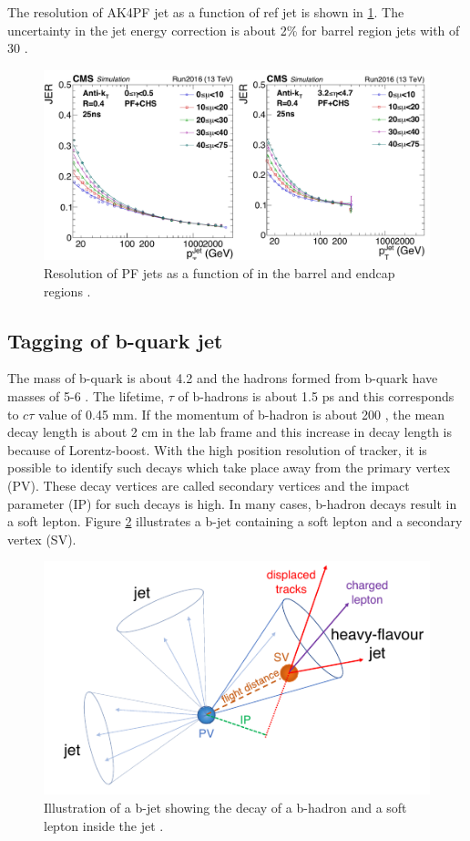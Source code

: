 The resolution of AK4PF jet as a function of ref jet is shown in \ref{fig:JER_2016}. The uncertainty in the jet energy correction is about 2\% for barrel region jets with \pt of 30 \gev \cite{CMS-DP-2018-028}.
\begin{figure}[h!]
\centering
\includegraphics[width=0.8\linewidth]{../Figures/Chap2/JER_2016}
\captionsetup{width=.9\linewidth}
\caption[AK4PF jet energy resolution]{Resolution of PF jets as a function of \pt in the barrel and endcap regions \cite{CMS-DP-2016-020}.}
\label{fig:JER_2016}
\end{figure}
\subsection{Tagging of b-quark jet}
The mass of b-quark is about 4.2 \gev and the hadrons formed from b-quark have masses of 5-6 \gev. The lifetime, $\tau$ of b-hadrons is about 1.5 ps and this corresponds to $c\tau$ value of 0.45 mm. If the momentum of b-hadron is about 200 \gev, the mean decay length is about 2 cm in the lab frame and this increase in decay length is because of Lorentz-boost. With the high position resolution of tracker, it is possible to identify such decays which take place away from the primary vertex (PV). These decay vertices are called secondary vertices and the impact parameter (IP) for such decays is high. In many cases, b-hadron decays result in a soft lepton. Figure \ref{fig:bJet} illustrates a b-jet containing a soft lepton and a secondary vertex (SV).
\begin{figure}[h!]
\centering
\includegraphics[width=0.7\linewidth]{../Figures/Chap2/bJet}
\caption[b-jet showing b-hadron decays]{Illustration of a b-jet showing the decay of a b-hadron and a soft lepton inside the jet \cite{BTV-16-002}.}
\label{fig:bJet}
\end{figure}


